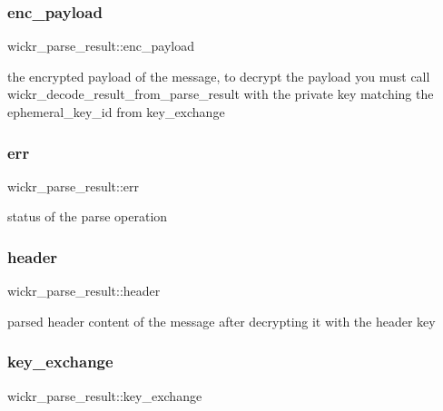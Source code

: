 \subsubsection{\texorpdfstring{enc\+\_\+payload}{enc\_payload}}
{\footnotesize\ttfamily wickr\+\_\+parse\+\_\+result\+::enc\+\_\+payload}

the encrypted payload of the message, to decrypt the payload you must call \textquotesingle{}wickr\+\_\+decode\+\_\+result\+\_\+from\+\_\+parse\+\_\+result\textquotesingle{} with the private key matching the \textquotesingle{}ephemeral\+\_\+key\+\_\+id\textquotesingle{} from \textquotesingle{}key\+\_\+exchange\textquotesingle{} \mbox{\label{structwickr__parse__result_a69a3ee332921b4fdbc0e07dbfa74a8ed}} 
\subsubsection{\texorpdfstring{err}{err}}
{\footnotesize\ttfamily wickr\+\_\+parse\+\_\+result\+::err}

status of the parse operation \mbox{\label{structwickr__parse__result_acf549d7cbae0f227d5aa60c3c5bb12d3}} 
\subsubsection{\texorpdfstring{header}{header}}
{\footnotesize\ttfamily wickr\+\_\+parse\+\_\+result\+::header}

parsed header content of the message after decrypting it with the header key \mbox{\label{structwickr__parse__result_ab33e5d00121c229280bbee814ca7ef5a}} 
\subsubsection{\texorpdfstring{key\+\_\+exchange}{key\_exchange}}
{\footnotesize\ttfamily wickr\+\_\+parse\+\_\+result\+::key\+\_\+exchange}

